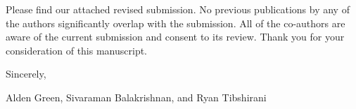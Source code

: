 \documentclass{article}
\begin{document}
Please find our attached revised submission. No previous publications by any of the authors significantly overlap with the submission. All of the co-authors are aware of the current submission and consent to its review. Thank you for your consideration of this manuscript.

\vspace{.2 in}

Sincerely,

\vspace{.1 in}
Alden Green, Sivaraman Balakrishnan, and Ryan Tibshirani
	
	
	
\end{document}
